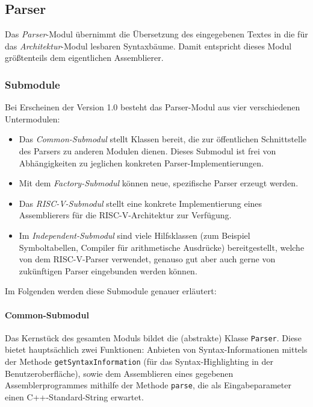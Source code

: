 \subsection{Parser}

Das \emph{Parser}-Modul übernimmt die Übersetzung des eingegebenen Textes in
die für das \emph{Architektur}-Modul lesbaren Syntaxbäume. Damit entspricht
dieses Modul größtenteils dem eigentlichen Assemblierer.

\subsubsection{Submodule}

Bei Erscheinen der Version 1.0 besteht das Parser-Modul aus vier verschiedenen
Untermodulen:

\begin{itemize}

\item Das \emph{Common-Submodul} stellt Klassen bereit, die zur öffentlichen
Schnittstelle des Parsers zu anderen Modulen dienen. Dieses Submodul ist frei
von Abhängigkeiten zu jeglichen konkreten Parser-Implementierungen.

\item Mit dem \emph{Factory-Submodul} können neue, spezifische Parser erzeugt
werden.

\item Das \emph{RISC-V-Submodul} stellt eine konkrete Implementierung eines
Assemblierers für die RISC-V-Architektur zur Verfügung.

\item Im \emph{Independent-Submodul} sind viele Hilfsklassen (zum Beispiel
Symboltabellen, Compiler für arithmetische Ausdrücke) bereitgestellt, welche von
dem RISC-V-Parser verwendet, genauso gut aber auch gerne von zukünftigen Parser
eingebunden werden können.

\end{itemize}

Im Folgenden werden diese Submodule genauer erläutert:

\paragraph{Common-Submodul}

Das Kernstück des gesamten Moduls bildet die (abstrakte) Klasse \texttt{Parser}.
Diese bietet hauptsächlich zwei Funktionen: Anbieten von Syntax-Informationen
mittels der Methode \texttt{getSyntaxInformation} (für das Syntax-Highlighting
in der Benutzeroberfläche), sowie dem Assemblieren eines gegebenen
Assemblerprogrammes mithilfe der Methode \texttt{parse}, die als
Eingabeparameter einen C++-Standard-String erwartet.


